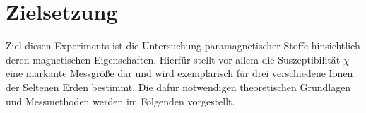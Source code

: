 \section{Zielsetzung}
\label{sec:Zielsetzung}

Ziel diesen Experiments ist die Untersuchung paramagnetischer Stoffe hinsichtlich deren magnetischen 
Eigenschaften. 
Hierfür stellt vor allem die Suszeptibilität $\chi$ eine markante Messgröße dar und wird exemplarisch 
für drei verschiedene Ionen der Seltenen Erden bestimmt. 
Die dafür notwendigen theoretischen Grundlagen und Messmethoden werden im Folgenden vorgestellt. 
